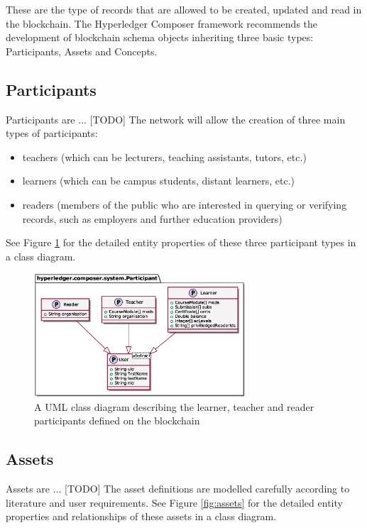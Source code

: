 These are the type of records that are allowed to be created, updated and read in the blockchain. 
The Hyperledger Composer framework recommends the development of blockchain schema objects 
inheriting three basic types: Participants, Assets and Concepts.

\subsection{Participants}

Participants are ... [TODO]
The network will allow the creation of three main types of participants: 
\begin{itemize}
    \setlength\itemsep{0em}    
    \item teachers (which can be lecturers, teaching assistants, tutors, etc.)
    \item learners (which can be campus students, distant learners, etc.)
    \item readers (members of the public who are interested in querying or verifying records, 
    such as employers and further education providers)
\end{itemize}

See Figure \ref{fig:participants} for the detailed entity properties of these three participant types 
in a class diagram.

\begin{figure}[!ht] 
    \centering    
    \includegraphics[width=0.7\textwidth]{participants}
    \caption[Participants Class Diagram]
        {A UML class diagram describing the learner, teacher and reader participants defined on the blockchain} 
    \label{fig:participants}
\end{figure}

\subsection{Assets}

Assets are ... [TODO]
The asset definitions are modelled carefully according to literature and user requirements.
See Figure \ref{fig:assets} for the detailed entity properties and relationships of these assets 
in a class diagram.

